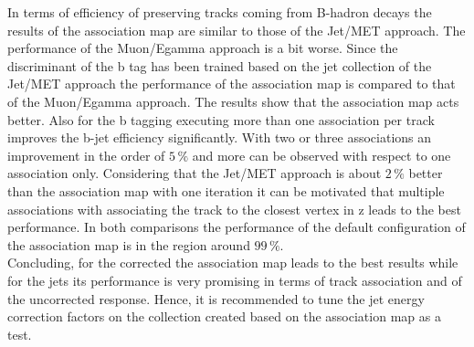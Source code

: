 In terms of efficiency of preserving tracks coming from B-hadron decays the results of the association map are similar to those of the Jet/MET approach. The performance of the Muon/Egamma approach is a bit worse. Since the discriminant of the b tag has been trained based on the jet collection of the Jet/MET approach the performance of the association map is compared to that of the Muon/Egamma approach. The results show that the association map acts better. Also for the b tagging executing more than one association per track improves the b-jet efficiency significantly. With two or three associations an improvement in the order of $5\,\%$ and more can be observed with respect to one association only. Considering that the Jet/MET approach is about $2\,\%$ better than the association map with one iteration it can be motivated that multiple associations with associating the track to the closest vertex in z leads to the best performance. In both comparisons the performance of the default configuration of the association map is in the region around $99\,\%$. \\
Concluding, for the corrected \MET{} the association map leads to the best results while for the jets its performance is very promising in terms of track association and of the uncorrected \pt{} response. Hence, it is recommended to tune the jet energy correction factors on the collection created based on the association map as a test.

